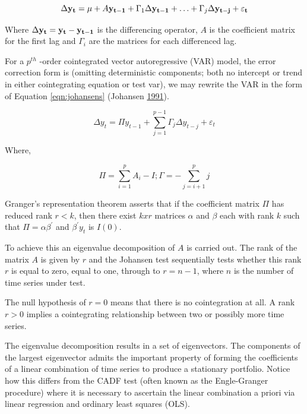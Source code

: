 \documentclass[12pt,]{article}
\begin{document}
\begin{equation}
\label{eqn:vecm-differenced}
\Delta {\bf y_t} = {\bf \mu} + A {\bf y_{t-1}} + \Gamma_1 \Delta {\bf y_{t-1}} + \ldots + \Gamma_j \Delta {\bf y_{t-j}} + {\bf \varepsilon_t}
\end{equation}

Where \(\Delta {\bf y_t} = {\bf y_t} - {\bf y_{t-1}}\) is the differencing operator, \(A\) is the coefficient matrix for the first lag and \(\Gamma_i\) are the matrices for each differenced lag.

For a \(p^{th}\) -order cointegrated vector autoregressive (VAR) model, the error correction form is (omitting deterministic components; both no intercept or trend in either cointegrating equation or test var), we may rewrite the VAR in the form of Equation \ref{eqn:johansens} (Johansen \protect\hyperlink{ref-johansen1991estimation}{1991}).

\begin{equation}
\label{eqn:johansens}
\Delta y_t = \Pi y_{t-1} + \sum_{j = 1}^{p-1} {\Gamma_j \Delta y_{t-j}} + \varepsilon_t
\end{equation}

Where,

\[
\Pi = \sum^{p}_{i = 1}{A_{i}-I}; \Gamma = -\sum^{p}_{j = i + 1}{j}
\]

Granger's representation theorem asserts that if the coefficient matrix \(\Pi\) has reduced rank \(r < k\), then there exist \(kxr\) matrices \(\alpha\) and \(\beta\) each with rank \(k\) such that \(\Pi = \alpha \beta^{\prime}\) and \(\beta^{\prime}y_t\) is \(I(0)\).

To achieve this an eigenvalue decomposition of \(A\) is carried out. The rank of the matrix \(A\) is given by \(r\) and the Johansen test sequentially tests whether this rank \(r\) is equal to zero, equal to one, through to \(r=n-1\), where \(n\) is the number of time series under test.

The null hypothesis of \(r=0\) means that there is no cointegration at all. A rank \(r > 0\) implies a cointegrating relationship between two or possibly more time series.

The eigenvalue decomposition results in a set of eigenvectors. The components of the largest eigenvector admits the important property of forming the coefficients of a linear combination of time series to produce a stationary portfolio. Notice how this differs from the CADF test (often known as the Engle-Granger procedure) where it is necessary to ascertain the linear combination a priori via linear regression and ordinary least squares (OLS).
\end{document}
